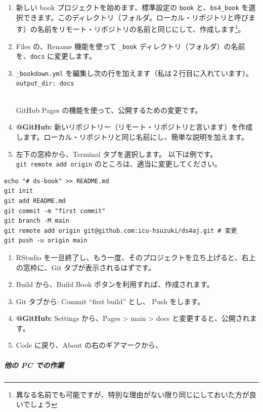 \documentclass[
]{bxjsbook}
\providecommand{\tightlist}{%
  \setlength{\itemsep}{0pt}\setlength{\parskip}{0pt}}
\theoremstyle{definition}
\theoremstyle{definition}
\theoremstyle{definition}
\theoremstyle{definition}
\theoremstyle{remark}
\begin{document}
\begin{enumerate}
\def\labelenumi{\arabic{enumi}.}
\tightlist
\item
  新しい book プロジェクトを始めます、標準設定の \texttt{book} と、\texttt{bs4\_book} を選択できます。このディレクトリ（フォルダ。ローカル・リポジトリと呼びます）の名前をリモート・リポジトリの名前と同じにして、作成します\footnote{異なる名前でも可能ですが、特別な理由がない限り同じにしておいた方が良いでしょう}。
\item
  Files の、Rename 機能を使って \texttt{\_book} ディレクトリ（フォルダ）の名前を、\texttt{docs} に変更します。
\item
  \texttt{\_bookdown.yml} を編集し次の行を加えます（私は２行目に入れています）。\\
  \texttt{output\_dir:\ docs}\strut \\
  GitHub Pages の機能を使って、公開するための変更です。
\item
  \textbf{@GitHub:} 新いリポジトリー（リモート・リポジトリと言います）を作成します。ローカル・リポジトリと同じ名前にし、簡単な説明を加えます。
\item
  左下の窓枠から、Terminal タブを選択します。 以下は例です。\texttt{git\ remote\ add\ origin} のところは、適当に変更してください。
\end{enumerate}

\begin{verbatim}
echo "# ds-book" >> README.md
git init
git add README.md
git commit -m "first commit"
git branch -M main
git remote add origin git@github.com:icu-hsuzuki/ds4aj.git # 変更
git push -u origin main
\end{verbatim}

\begin{enumerate}
\def\labelenumi{\arabic{enumi}.}
\setcounter{enumi}{4}
\tightlist
\item
  RStudio を一旦終了し、もう一度、そのプロジェクトを立ち上げると、右上の窓枠に、Git タブが表示されるはずです。
\item
  Build から、Build Book ボタンを利用すれば、作成されます。
\item
  Git タブから: Commit ``first build'' とし、 Push をします。
\item
  \textbf{@GitHub:} Settings から、Pages \textgreater{} main \textgreater{} docs と変更すると、公開されます。
\item
  Code に戻り、About の右のギアマークから、
\end{enumerate}

\hypertarget{ux4ed6ux306e-pc-ux3067ux306eux4f5cux696d}{%
\subparagraph{他の PC での作業}\label{ux4ed6ux306e-pc-ux3067ux306eux4f5cux696d}}
\end{document}
